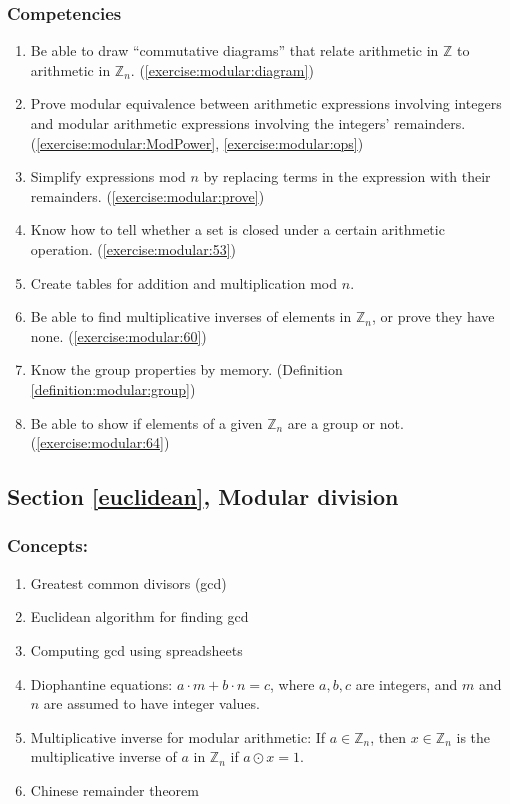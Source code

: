 \subsubsection*{Competencies}
\begin{enumerate}
\item
Be able to draw ``commutative diagrams'' that relate arithmetic in ${\mathbb Z}$ to arithmetic in ${\mathbb Z}_{n}$. (\ref{exercise:modular:diagram}) 
\item
Prove modular equivalence between arithmetic expressions involving integers and modular arithmetic expressions involving the integers' remainders. (\ref{exercise:modular:ModPower}, \ref{exercise:modular:ops}) 
\item
Simplify expressions mod $n$ by replacing terms in the expression with their remainders. (\ref{exercise:modular:prove})
\item
Know how to tell whether a set is closed under a certain arithmetic operation. (\ref{exercise:modular:53})
\item
Create tables for addition and multiplication mod $n$.
\item
Be able to find multiplicative inverses of elements in ${\mathbb Z}_{n}$, or prove they have none. (\ref{exercise:modular:60})
\item
Know the group properties by memory. (Definition \ref{definition:modular:group})
\item
Be able to show if elements of a given ${\mathbb Z}_{n}$ are a group or not. (\ref{exercise:modular:64})
\end{enumerate}


\subsection*{Section \ref{euclidean}, Modular division}
\subsubsection*{Concepts:}
\begin{enumerate}
\item 
Greatest common divisors (gcd)
\item 
Euclidean algorithm for finding gcd
\item 
Computing gcd using spreadsheets
\item 
Diophantine equations: $a \cdot m + b \cdot n = c$, where $a, b, c$ are integers, and $m$ and $n$ are assumed to have integer values.
\item 
Multiplicative inverse for modular arithmetic: If $a \in \mathbb{Z}_n$, then $x \in  \mathbb{Z}_n$ is the multiplicative inverse of $a$ in $\mathbb{Z}_n$ if $a \odot x = 1$.
\item 
Chinese remainder theorem
\end{enumerate}

